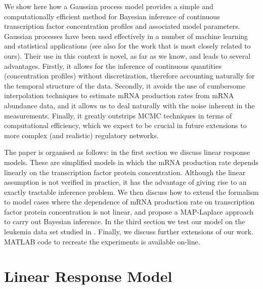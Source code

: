 \documentclass[english]{article}
\begin{document}
We show
here how a Gaussian process model provides a simple and computationally 
efficient method for Bayesian inference of
continuous transcription factor concentration profiles and associated
model parameters. Gaussian processes have been used effectively in a number
of machine learning and statistical applications \cite{Rasmussen:book05} (see also \cite{Graepel:gpdiff03,Murray-Smith:transformations05} for the work that is most closely related to ours). 
Their use in this context is novel, as far as we know, and leads to several 
advantages. Firstly, it allows
for the inference of continuous quantities (concentration profiles)
without discretization, therefore accounting naturally for the temporal 
structure of the data. Secondly, it avoids the use of cumbersome interpolation
techniques to estimate mRNA production rates from mRNA abundance data, and it
allows us to deal naturally with the noise inherent 
in the measurements. Finally,
it greatly outstrips MCMC techniques in terms of computational efficiency, 
which we expect to be crucial in future extensions to more complex (and
realistic) regulatory networks.

The paper is organised as follows: in the first section we discuss linear 
response models. These are simplified models in which the mRNA production
rate depends linearly on the transcription factor protein concentration. 
Although the linear assumption is not verified in practice, it has the 
advantage of giving rise to an exactly tractable inference problem. We then
discuss how to extend the formalism to model cases where the dependence of
mRNA production rate on transcription factor protein concentration is not 
linear, and propose a MAP-Laplace approach to carry out Bayesian inference. 
In the third section we test our model on the leukemia data set studied in
\cite{Barenco:ranked06}. Finally, we discuss further extensions of our
work. 
MATLAB code to recreate the experiments is available on-line.
\section{Linear Response Model}
\end{document}
